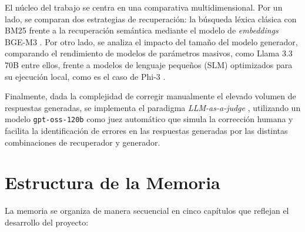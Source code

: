 El núcleo del trabajo se centra en una comparativa multidimensional. Por un lado, se comparan dos estrategias de recuperación: la búsqueda léxica clásica con BM25 frente a la recuperación semántica mediante el modelo de \textit{embeddings} BGE-M3 \cite{chen2024bge}. Por otro lado, se analiza el impacto del tamaño del modelo generador, comparando el rendimiento de modelos de parámetros masivos, como Llama 3.3 70B entre ellos, frente a modelos de lenguaje pequeños (SLM) optimizados para su ejecución local, como es el caso de Phi-3 \cite{abdin2024phi3}.

Finalmente, dada la complejidad de corregir manualmente el elevado volumen de respuestas generadas, se implementa el paradigma \textit{LLM-as-a-judge} \cite{zheng2023judging}, utilizando un modelo \texttt{gpt-oss-120b} \cite{openai2025gptoss} como juez automático que simula la corrección humana y facilita la identificación de errores en las respuestas generadas por las distintas combinaciones de recuperador y generador.

\section{Estructura de la Memoria}

La memoria se organiza de manera secuencial en cinco capítulos que reflejan el desarrollo del proyecto:

